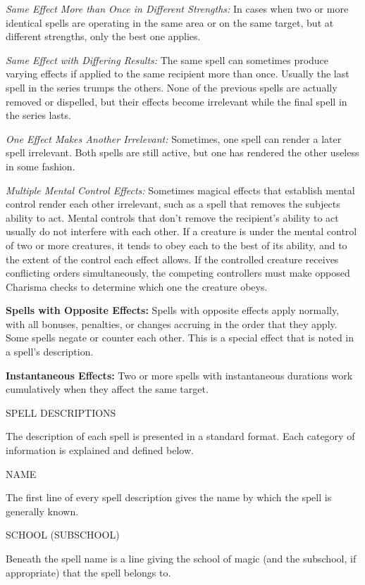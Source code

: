 \documentclass{article}
\begin{document}
\textit{Same Effect More than Once in Different Strengths: }In cases when two or 
more identical spells are operating in the same area or on the same target, but 
at different strengths, only the best one applies.

\textit{Same Effect with Differing Results: }The same spell can sometimes produce 
varying effects if applied to the same recipient more than once. Usually the last 
spell in the series trumps the others. None of the previous spells are actually 
removed or dispelled, but their effects become irrelevant while the final spell 
in the series lasts.

\textit{One Effect Makes Another Irrelevant: }Sometimes, one spell can render a 
later spell irrelevant. Both spells are still active, but one has rendered the 
other useless in some fashion.

\textit{Multiple Mental Control Effects: }Sometimes magical effects that establish 
mental control render each other irrelevant, such as a spell that removes the subjects 
ability to act. Mental controls that don't remove the recipient's ability to act 
usually do not interfere with each other. If a creature is under the mental control 
of two or more creatures, it tends to obey each to the best of its ability, and 
to the extent of the control each effect allows. If the controlled creature receives 
conflicting orders simultaneously, the competing controllers must make opposed 
Charisma checks to determine which one the creature obeys.

\textbf{Spells with Opposite Effects:} Spells with opposite effects apply normally, 
with all bonuses, penalties, or changes accruing in the order that they apply. 
Some spells negate or counter each other. This is a special effect that is noted 
in a spell's description. 

\textbf{Instantaneous Effects:} Two or more spells with instantaneous durations 
work cumulatively when they affect the same target.

\vspace{12pt}
{\LARGE{}SPELL DESCRIPTIONS}

The description of each spell is presented in a standard format. Each category 
of information is explained and defined below.

NAME

The first line of every spell description gives the name by which the spell is 
generally known.

SCHOOL (SUBSCHOOL)

Beneath the spell name is a line giving the school of magic (and the subschool, 
if appropriate) that the spell belongs to.
\end{document}
